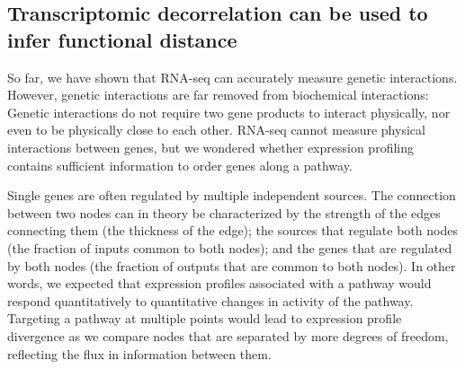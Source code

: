 \documentclass[9pt,twocolumn,twoside]{pnas-new}
\begin{document}
\subsection*{Transcriptomic decorrelation can be used to infer functional distance}
\label{sub:decorrelation}
So far, we have shown that RNA-seq can accurately measure genetic interactions.
However, genetic interactions are far removed from biochemical interactions:
Genetic interactions do not require two gene products to interact physically, nor
even to be physically close to each other. RNA-seq cannot measure physical
interactions between genes, but we wondered whether expression profiling contains
sufficient information to order genes along a pathway.

Single
genes are often regulated by multiple independent sources. The connection between
two nodes can in theory be characterized by the strength of the edges connecting
them (the thickness of the edge); the sources that regulate both
nodes (the fraction of inputs common to both nodes); and the genes that are
regulated by both nodes (the fraction of outputs that are common to both nodes).
In other words, we expected that expression profiles associated with a pathway
would respond quantitatively to quantitative changes in activity of the pathway.
Targeting a pathway at multiple points would lead to expression profile
divergence as we compare nodes that are separated by more degrees of freedom,
reflecting the flux in information between them.
\end{document}
